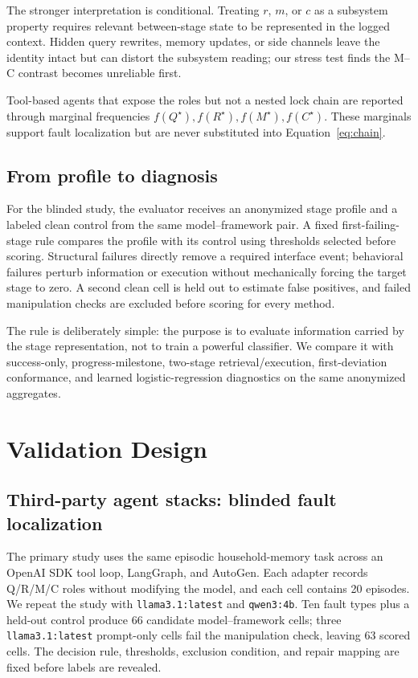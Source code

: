 \documentclass{article}
\newcommand{\Qstar}{Q^{\star}}
\newcommand{\Rstar}{R^{\star}}
\newcommand{\Mstar}{M^{\star}}
\newcommand{\Cstar}{C^{\star}}
\begin{document}
The stronger interpretation is conditional. Treating $r$, $m$, or $c$ as a subsystem property requires relevant between-stage state to be represented in the logged context. Hidden query rewrites, memory updates, or side channels leave the identity intact but can distort the subsystem reading; our stress test finds the M--C contrast becomes unreliable first.

Tool-based agents that expose the roles but not a nested lock chain are reported through marginal frequencies $f(\Qstar),f(\Rstar),f(\Mstar),f(\Cstar)$. These marginals support fault localization but are never substituted into Equation~\ref{eq:chain}.

\subsection{From profile to diagnosis}

For the blinded study, the evaluator receives an anonymized stage profile and a labeled clean control from the same model--framework pair. A fixed first-failing-stage rule compares the profile with its control using thresholds selected before scoring. Structural failures directly remove a required interface event; behavioral failures perturb information or execution without mechanically forcing the target stage to zero. A second clean cell is held out to estimate false positives, and failed manipulation checks are excluded before scoring for every method.

The rule is deliberately simple: the purpose is to evaluate information carried by the stage representation, not to train a powerful classifier. We compare it with success-only, progress-milestone, two-stage retrieval/execution, first-deviation conformance, and learned logistic-regression diagnostics on the same anonymized aggregates.

\section{Validation Design}
\label{sec:design}

\subsection{Third-party agent stacks: blinded fault localization}

The primary study uses the same episodic household-memory task across an OpenAI SDK tool loop, LangGraph, and AutoGen. Each adapter records Q/R/M/C roles without modifying the model, and each cell contains 20 episodes. We repeat the study with \texttt{llama3.1:latest} and \texttt{qwen3:4b}. Ten fault types plus a held-out control produce 66 candidate model--framework cells; three \texttt{llama3.1:latest} prompt-only cells fail the manipulation check, leaving 63 scored cells. The decision rule, thresholds, exclusion condition, and repair mapping are fixed before labels are revealed.
\end{document}
